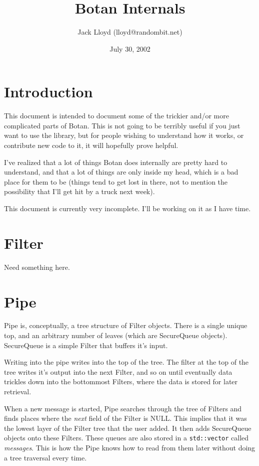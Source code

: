 \documentclass{article}
\title{Botan Internals}
\author{Jack Lloyd (lloyd@randombit.net)}
\date{July 30, 2002}
\newcommand{\type}[1]{\texttt{#1}}
\renewcommand{\arg}[1]{\textsl{#1}}
\begin{document}
\maketitle

\tableofcontents

\parskip=5pt

\section{Introduction}

This document is intended to document some of the trickier and/or more
complicated parts of Botan. This is not going to be terribly useful if you
just want to use the library, but for people wishing to understand how it
works, or contribute new code to it, it will hopefully prove helpful.

I've realized that a lot of things Botan does internally are pretty hard to
understand, and that a lot of things are only inside my head, which is a bad
place for them to be (things tend to get lost in there, not to mention the
possibility that I'll get hit by a truck next week).

This document is currently very incomplete. I'll be working on it as I have
time.

\pagebreak

\section{Filter}

Need something here.

\section{Pipe}

Pipe is, conceptually, a tree structure of Filter objects. There is a single
unique top, and an arbitrary number of leaves (which are SecureQueue objects).
SecureQueue is a simple Filter that buffers it's input.

Writing into the pipe writes into the top of the tree. The filter at the top
of the tree writes it's output into the next Filter, and so on until eventually
data trickles down into the bottommost Filters, where the data is stored for
later retrieval.

When a new message is started, Pipe searches through the tree of Filters and
finds places where the \arg{next} field of the Filter is NULL. This implies
that it was the lowest layer of the Filter tree that the user added. It then
adds SecureQueue objects onto these Filters. These queues are also stored in a
\type{std::vector} called \arg{messages}. This is how the Pipe knows how to
read from them later without doing a tree traversal every time.
\end{document}
